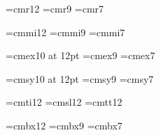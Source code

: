 %
%
%
%



\font\twelverm   =cmr12    %
\font\ninerm     =cmr9     %
\font\sevenrm    =cmr7     %

\font\twelvemi   =cmmi12   %
\font\ninemi     =cmmi9    %
\font\sevenmi    =cmmi7    %

\font\twelveex   =cmex10 at 12pt  %
\font\nineex     =cmex9    %
\font\sevenex    =cmex7    %

\font\twelvesy   =cmsy10 at 12pt  %
\font\ninesy     =cmsy9    %
\font\sevensy    =cmsy7    %

\font\twelveit   =cmti12   %
\font\twelvesl   =cmsl12   %
\font\twelvett   =cmtt12   %

\font\twelvebf   =cmbx12   %
\font\ninebf     =cmbx9    %
\font\sevenbf    =cmbx7    %

\def\twelvepoints{
  \def\rm{\fam0\twelverm}
  \normalbaselineskip=14.4pt
  \textfont0=\twelverm \scriptfont0=\ninerm \scriptscriptfont0=\sevenrm
  \textfont1=\twelvemi \scriptfont1=\ninemi \scriptscriptfont1=\sevenmi
  \textfont2=\twelvesy \scriptfont2=\ninesy \scriptscriptfont2=\sevensy
  \textfont3=\twelveex \scriptfont3=\nineex \scriptscriptfont3=\sevenex
  \textfont\itfam=\twelveit  \def\it{\fam\itfam\twelveit}
  \textfont\slfam=\twelvesl  \def\sl{\fam\slfam\twelvesl}
  \textfont\ttfam=\twelvett  \def\tt{\fam\ttfam\twelvett}
  \textfont\bffam=\twelvebf  \def\bf{\fam\bffam\twelvebf}
  \scriptfont\bffam=\ninebf  \scriptscriptfont\bffam=\sevenbf
}


